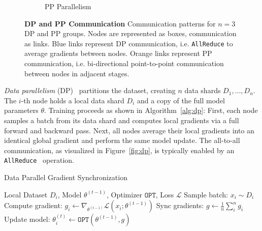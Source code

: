 \documentclass{article}
\begin{document}
\begin{figure}[ht]
\begin{subfigure}[b]{0.22\textwidth}
        \caption{PP Parallelism}
        \label{fig:pp}
    \end{subfigure}
    \caption{\textbf{DP and PP Communication} Communication patterns for $n=3$
    DP and PP groups. Nodes are represented as boxes, communication as links.
    {\color{bblue} Blue links} represent DP communication, i.e.
    \texttt{AllReduce} to average gradients between nodes.
    {\color{oorange}Orange links} represent PP communication, i.e.
    bi-directional point-to-point communication between nodes in adjacent
    stages.}
\end{figure}

\textit{Data parallelism} (DP)~\cite{dean2012dp} partitions the dataset,
creating $n$ data shards $D_1,\dots,D_n$. The $i$-th node holds a local data
shard $D_i$ and a copy of the full model parameters $\theta$. Training proceeds
as shown in Algorithm~\ref{alg:dp}: First, each node samples a batch from its
data shard and computes local gradients via a full forward and backward pass.
Next, all nodes average their local gradients into an identical global gradient
and perform the same model update. The all-to-all communication, as visualized
in Figure~\ref{fig:dp}, is typically enabled by an
\texttt{AllReduce}~\cite{walker1995mpi} operation.


\begin{algorithm}
\caption{Data Parallel Gradient Synchronization}
\label{alg:dp}
\begin{algorithmic}[1]
 Local Dataset $D_i$, Model $\theta^{(t-1)}$, Optimizer $\mathtt{OPT}$, Loss $\mathcal{L}$
\State Sample batch: $x_i\sim D_i$
\State Compute gradient: $g_i \gets \nabla_{\theta^{(t-1)}} \mathcal{L}(x_i; \theta^{(t-1)})$
\State Sync gradients: $g \gets \frac{1}{n}\sum_{i}^n g_i$ 
\State Update model: $\theta_i^{(t)} \gets \mathtt{OPT}(\theta^{(t-1)}, g)$
\end{algorithmic}
\end{algorithm}
\end{document}
